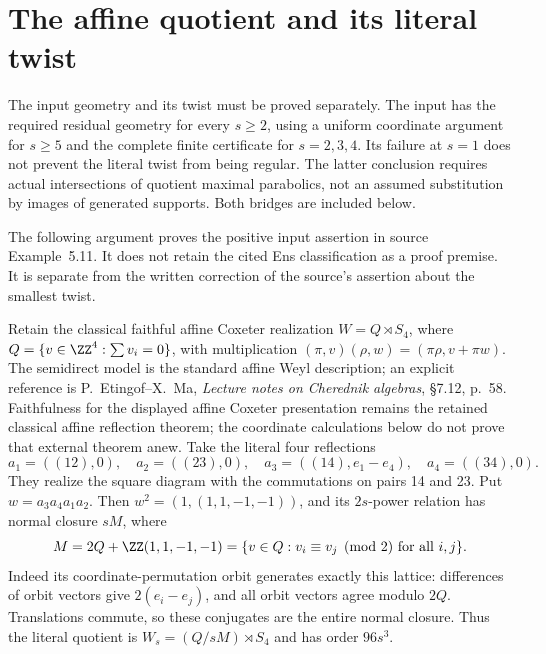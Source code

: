 \section{The affine quotient and its literal twist}\label{sec:app-affine}
The input geometry and its twist must be proved separately. The input has the required residual geometry for every $s\geq2$, using a uniform coordinate argument for $s\geq5$ and the complete finite certificate for $s=2,3,4$. Its failure at $s=1$ does not prevent the literal twist from being regular. The latter conclusion requires actual intersections of quotient maximal parabolics, not an assumed substitution by images of generated supports. Both bridges are included below.


The following argument proves the positive input assertion in source Example~5.11. It does not retain the cited Ens classification as a proof premise. It is separate from the written
correction of the source's assertion about the smallest twist.

Retain the classical faithful affine Coxeter realization
$W=Q\rtimes S_4$, where $Q=\{v\in\ZZ^4:\sum v_i=0\}$,
with multiplication $(\pi,v)(\rho,w)=(\pi\rho,v+\pi w)$.
The semidirect model is the standard affine Weyl description; an
explicit reference is P.~Etingof--X.~Ma, \emph{Lecture notes on
Cherednik algebras}, \S7.12, p.~58. Faithfulness for the displayed
affine Coxeter presentation remains the retained classical affine
reflection theorem; the coordinate calculations below do not prove
that external theorem anew.
Take the literal four reflections
\[
 a_1=((12),0),\quad a_2=((23),0),\quad
 a_3=((14),e_1-e_4),\quad a_4=((34),0).
\]
They realize the square diagram with the commutations on pairs 14
and 23. Put $w=a_3a_4a_1a_2$. Then
$w^2=(1,(1,1,-1,-1))$, and its $2s$-power relation has normal
closure $sM$, where
\[
 M=2Q+\ZZ(1,1,-1,-1)
  =\{v\in Q:v_i\equiv v_j\pmod2\text{ for all }i,j\}.
\]
Indeed its coordinate-permutation orbit generates exactly this lattice:
differences of orbit vectors give $2(e_i-e_j)$, and all orbit
vectors agree modulo $2Q$. Translations commute, so these conjugates
are the entire normal closure. Thus the literal quotient is
$W_s=(Q/sM)\rtimes S_4$ and has order $96s^3$.

